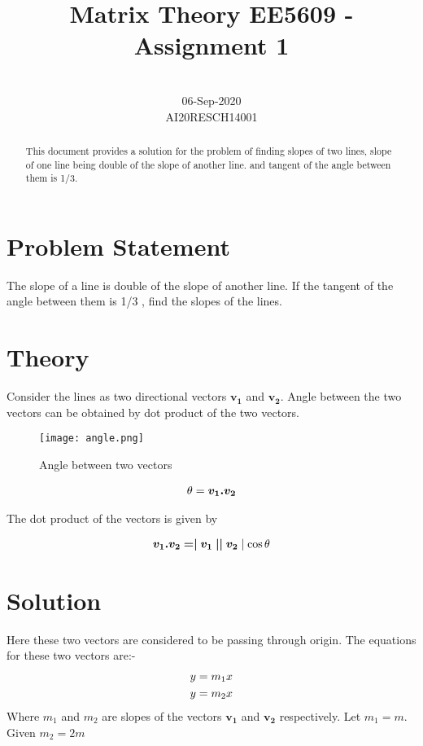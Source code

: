 \documentclass[conference]{IEEEtran}
\begin{document}
\title{Matrix Theory EE5609 - Assignment 1\\ 
}

\author{
 \\
06-Sep-2020\\
AI20RESCH14001\\
 }

\maketitle

\begin{abstract}
This document provides a solution for the problem of finding slopes of two lines,  slope of one line being double of the slope of another line. and tangent of the angle between them is 1/3.
\end{abstract}

\section{Problem Statement}
The slope of a line is double of the slope of another line. If the tangent of the angle between them is 1/3 , find the slopes of the lines.
\section{Theory}

Consider the lines as two directional vectors $\bm{v_{1}}$  and    $\bm{v_{2}}$. Angle between the two vectors can be obtained by dot product of the two vectors.
\begin{figure}[h!]
\centering
\texttt{[image: angle.png]}
\caption{Angle between two vectors}
\end{figure}

\begin{align}\notag
\theta = \bm{v_{1}  .  v_{2}}
\end{align}

The dot product of the vectors is given by

\begin{align}\notag
 \bm{v_{1}  .  v_{2} = \mid v_{1}\mid \mid v_{2}}\mid \cos \theta
\end{align}


\section{Solution}
Here these two vectors are considered to be passing through origin. The equations for these two vectors are:-
\begin{align}\notag
 y &= m_{1}x\\ \notag
 y &= m_{2}x
\end{align}
Where  $m_{1}$   and  $ m_{2}$ are slopes of the vectors $\bm{v_{1}}$   and    $\bm{v_{2}}$ respectively.
Let  $m_{1} = m$. Given  $m_{2} = 2m$
\end{document}
